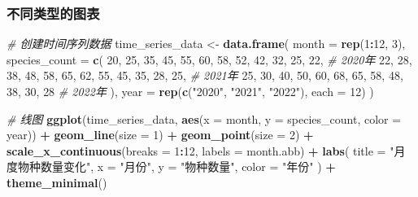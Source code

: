 \documentclass[
  twoside]{book}
\newenvironment{Shaded}{\begin{snugshade}}{\end{snugshade}}
\newcommand{\AttributeTok}[1]{\textcolor[rgb]{0.13,0.29,0.53}{#1}}
\newcommand{\CommentTok}[1]{\textcolor[rgb]{0.56,0.35,0.01}{\textit{#1}}}
\newcommand{\DecValTok}[1]{\textcolor[rgb]{0.00,0.00,0.81}{#1}}
\newcommand{\FunctionTok}[1]{\textcolor[rgb]{0.13,0.29,0.53}{\textbf{#1}}}
\newcommand{\NormalTok}[1]{#1}
\newcommand{\OtherTok}[1]{\textcolor[rgb]{0.56,0.35,0.01}{#1}}
\newcommand{\SpecialCharTok}[1]{\textcolor[rgb]{0.81,0.36,0.00}{\textbf{#1}}}
\newcommand{\StringTok}[1]{\textcolor[rgb]{0.31,0.60,0.02}{#1}}
\begin{document}
\hypertarget{ux4e0dux540cux7c7bux578bux7684ux56feux8868}{%
\subsubsection{不同类型的图表}\label{ux4e0dux540cux7c7bux578bux7684ux56feux8868}}

\begin{Shaded}
\begin{Highlighting}[]
\CommentTok{\# 创建时间序列数据}
\NormalTok{time\_series\_data }\OtherTok{\textless{}{-}} \FunctionTok{data.frame}\NormalTok{(}
  \AttributeTok{month =} \FunctionTok{rep}\NormalTok{(}\DecValTok{1}\SpecialCharTok{:}\DecValTok{12}\NormalTok{, }\DecValTok{3}\NormalTok{),}
  \AttributeTok{species\_count =} \FunctionTok{c}\NormalTok{(}
    \DecValTok{20}\NormalTok{, }\DecValTok{25}\NormalTok{, }\DecValTok{35}\NormalTok{, }\DecValTok{45}\NormalTok{, }\DecValTok{55}\NormalTok{, }\DecValTok{60}\NormalTok{, }\DecValTok{58}\NormalTok{, }\DecValTok{52}\NormalTok{, }\DecValTok{42}\NormalTok{, }\DecValTok{32}\NormalTok{, }\DecValTok{25}\NormalTok{, }\DecValTok{22}\NormalTok{,  }\CommentTok{\# 2020年}
    \DecValTok{22}\NormalTok{, }\DecValTok{28}\NormalTok{, }\DecValTok{38}\NormalTok{, }\DecValTok{48}\NormalTok{, }\DecValTok{58}\NormalTok{, }\DecValTok{65}\NormalTok{, }\DecValTok{62}\NormalTok{, }\DecValTok{55}\NormalTok{, }\DecValTok{45}\NormalTok{, }\DecValTok{35}\NormalTok{, }\DecValTok{28}\NormalTok{, }\DecValTok{25}\NormalTok{,  }\CommentTok{\# 2021年}
    \DecValTok{25}\NormalTok{, }\DecValTok{30}\NormalTok{, }\DecValTok{40}\NormalTok{, }\DecValTok{50}\NormalTok{, }\DecValTok{60}\NormalTok{, }\DecValTok{68}\NormalTok{, }\DecValTok{65}\NormalTok{, }\DecValTok{58}\NormalTok{, }\DecValTok{48}\NormalTok{, }\DecValTok{38}\NormalTok{, }\DecValTok{30}\NormalTok{, }\DecValTok{28}   \CommentTok{\# 2022年}
\NormalTok{  ),}
  \AttributeTok{year =} \FunctionTok{rep}\NormalTok{(}\FunctionTok{c}\NormalTok{(}\StringTok{"2020"}\NormalTok{, }\StringTok{"2021"}\NormalTok{, }\StringTok{"2022"}\NormalTok{), }\AttributeTok{each =} \DecValTok{12}\NormalTok{)}
\NormalTok{)}

\CommentTok{\# 线图}
\FunctionTok{ggplot}\NormalTok{(time\_series\_data, }\FunctionTok{aes}\NormalTok{(}\AttributeTok{x =}\NormalTok{ month, }\AttributeTok{y =}\NormalTok{ species\_count, }\AttributeTok{color =}\NormalTok{ year)) }\SpecialCharTok{+}
  \FunctionTok{geom\_line}\NormalTok{(}\AttributeTok{size =} \DecValTok{1}\NormalTok{) }\SpecialCharTok{+}
  \FunctionTok{geom\_point}\NormalTok{(}\AttributeTok{size =} \DecValTok{2}\NormalTok{) }\SpecialCharTok{+}
  \FunctionTok{scale\_x\_continuous}\NormalTok{(}\AttributeTok{breaks =} \DecValTok{1}\SpecialCharTok{:}\DecValTok{12}\NormalTok{, }\AttributeTok{labels =}\NormalTok{ month.abb) }\SpecialCharTok{+}
  \FunctionTok{labs}\NormalTok{(}
    \AttributeTok{title =} \StringTok{"月度物种数量变化"}\NormalTok{,}
    \AttributeTok{x =} \StringTok{"月份"}\NormalTok{,}
    \AttributeTok{y =} \StringTok{"物种数量"}\NormalTok{,}
    \AttributeTok{color =} \StringTok{"年份"}
\NormalTok{  ) }\SpecialCharTok{+}
  \FunctionTok{theme\_minimal}\NormalTok{()}


\end{Highlighting}
\end{Shaded}
\end{document}

